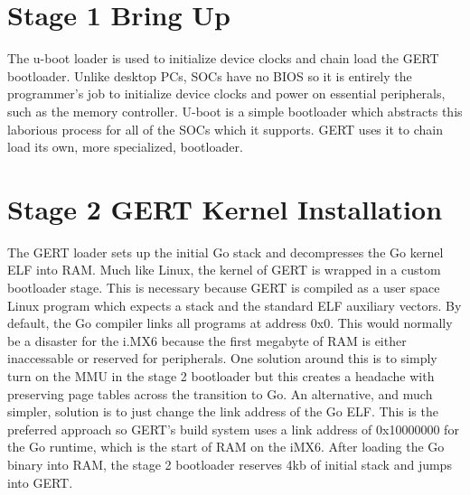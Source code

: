 
\section{Stage 1 Bring Up}
The u-boot loader is used to initialize device clocks and chain load the GERT bootloader.
Unlike desktop PCs, SOCs have no BIOS so it is entirely the programmer's job to initialize device clocks
and power on essential peripherals, such as the memory controller. U-boot is a simple bootloader which abstracts
this laborious process for all of the SOCs which it supports. GERT uses it to chain load its own, more specialized,
bootloader.


\section{Stage 2 GERT Kernel Installation}
The GERT loader sets up the initial Go stack and decompresses the Go kernel
ELF into RAM. Much like Linux, the kernel of GERT is wrapped in a custom
bootloader stage. This is necessary because GERT is compiled as a user space
Linux program which expects a stack and the standard ELF auxiliary vectors. By
default, the Go compiler links all programs at address 0x0. This would normally
be a disaster for the i.MX6 because the first megabyte of RAM is either inaccessable
or reserved for peripherals. One solution around this is to simply turn on the MMU
in the stage 2 bootloader but this creates a headache with preserving page tables
across the transition to Go. An alternative, and much simpler, solution is to
just change the link address of the Go ELF. This is the preferred approach so
GERT's build system uses a link address of 0x10000000 for the Go runtime, which is the start of
RAM on the iMX6. After loading the Go binary into RAM, the stage 2 bootloader reserves
4kb of initial stack and jumps into GERT.


